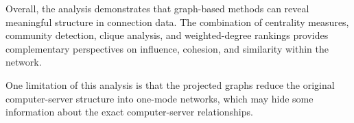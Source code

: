 \documentclass[11pt,a4paper]{article}
\begin{document}
Overall, the analysis demonstrates that graph-based methods can reveal meaningful structure in connection data. The combination of centrality measures, community detection, clique analysis, and weighted-degree rankings provides complementary perspectives on influence, cohesion, and similarity within the network.

One limitation of this analysis is that the projected graphs reduce the original computer-server structure into one-mode networks, which may hide some information about the exact computer-server relationships.
\end{document}
